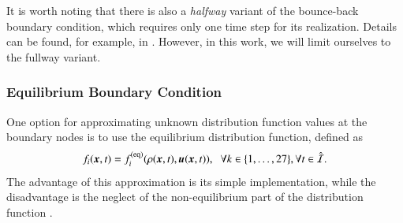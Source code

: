 It is worth noting that there is also a \textit{halfway} variant of the bounce-back boundary condition, which requires only one time step for its realization. Details can be found, for example, in \cite{Kruger}. However, in this work, we will limit ourselves to the fullway variant.

\subsubsection{Equilibrium Boundary Condition}\label{equilibrium bc}
One option for approximating unknown distribution function values at the boundary nodes is to use the equilibrium distribution function, defined as \cite{PE}
\begin{equation}
	f_i(\vec{x}, t)=f_{i}^{\text{(eq)}}(\rho(\vec{x}, t), \vec{u}(\vec{x}, t)), \hspace{2mm}  \forall k \in \{1,\dots,27\}, \forall t \in \hat{\mathcal{I}}.
\end{equation}
The advantage of this approximation is its simple implementation, while the disadvantage is the neglect of the non-equilibrium part of the distribution function \cite{PE}.
